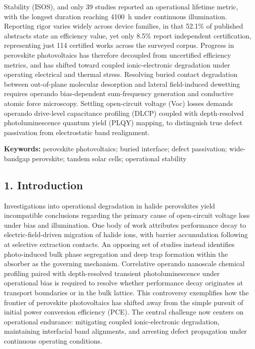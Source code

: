 \documentclass[
  11pt,
]{article}
\begin{document}
Stability (ISOS), and only 39 studies reported an operational lifetime
metric, with the longest duration reaching \qty{4100}{\hour} under
continuous illumination. Reporting rigor varies widely across device
families, in that 52.1\% of published abstracts state an efficiency
value, yet only 8.5\% report independent certification, representing
just 114 certified works across the surveyed corpus. Progress in
perovskite photovoltaics has therefore decoupled from uncertified
efficiency metrics, and has shifted toward coupled ionic-electronic
degradation under operating electrical and thermal stress. Resolving
buried contact degradation between out-of-plane molecular desorption and
lateral field-induced dewetting requires operando bias-dependent
sum-frequency generation and conductive atomic force microscopy.
Settling open-circuit voltage (Voc) losses demands operando drive-level
capacitance profiling (DLCP) coupled with depth-resolved
photoluminescence quantum yield (PLQY) mapping, to distinguish true
defect passivation from electrostatic band realignment.

\textbf{Keywords:} perovskite photovoltaics; buried interface; defect
passivation; wide-bandgap perovskite; tandem solar cells; operational
stability

\subsection{1. Introduction}\label{introduction}

Investigations into operational degradation in halide perovskites yield
incompatible conclusions regarding the primary cause of open-circuit
voltage loss under bias and illumination. One body of work attributes
performance decay to electric-field-driven migration of halide ions,
with barrier accumulation following at selective extraction contacts. An
opposing set of studies instead identifies photo-induced bulk phase
segregation and deep trap formation within the absorber as the governing
mechanism. Correlative operando nanoscale chemical profiling paired with
depth-resolved transient photoluminescence under operational bias is
required to resolve whether performance decay originates at transport
boundaries or in the bulk lattice. This controversy exemplifies how the
frontier of perovskite photovoltaics has shifted away from the simple
pursuit of initial power conversion efficiency (PCE). The central
challenge now centers on operational endurance: mitigating coupled
ionic-electronic degradation, maintaining interfacial band alignments,
and arresting defect propagation under continuous operating conditions.
\end{document}
